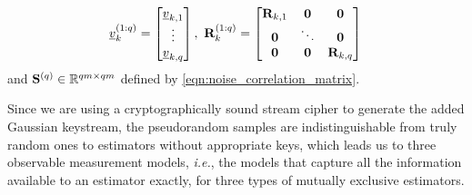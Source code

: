 \documentclass[conference]{IEEEtran}
\theoremstyle{definition}
\theoremstyle{remark}
\begin{document}
\begin{equation*}
  \vec{v}_k^{(1:q)}=
  \begin{bmatrix}
    \vec{v}_{k,1}\\
    \vdots\\
    \vec{v}_{k,q}
  \end{bmatrix},\ 
  \mat{R}_k^{(1:q)}=
    \begin{bmatrix}
      \mat{R}_{k,1} & \mat{0} & \mat{0}\\
      \mat{0} & \ddots & \mat{0}\\
      \mat{0} & \mat{0} & \mat{R}_{k,q}
    \end{bmatrix}\,
\end{equation*}
and ${{\mathbf{S}}}^{(q)} \in \mathbb{R}^{qm\times qm}$ defined by \eqref{eqn:noise_correlation_matrix}.

Since we are using a cryptographically sound stream cipher to generate the added Gaussian keystream, the pseudorandom samples are indistinguishable from truly random ones to estimators without appropriate keys, which leads us to three observable measurement models, \textit{i.e.}, the models that capture all the information available to an estimator exactly, for three types of mutually exclusive estimators.
\end{document}
